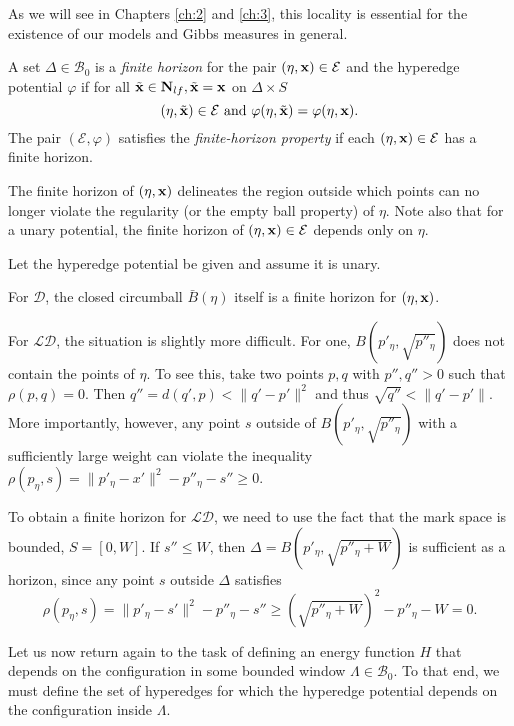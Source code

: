 As we will see in Chapters \ref{ch:2} and \ref{ch:3}, this locality is essential for the existence of our models and Gibbs measures in general. 

\begin{definition}
	A set $\Delta \in \mathcal B_0$ is a \textit{finite horizon} for the pair $(\eta,{\mathbf{x}}) \in \mathcal E$ and the hyperedge potential $\varphi$ if for all $\tilde{{\mathbf{x}}} \in \mathbf N_{lf}, \tilde{{\mathbf{x}}} = {\mathbf{x}}$ on $\Delta\times S$ 
$$(\eta,\tilde{{\mathbf{x}}})\in\mathcal E \text{ and } \varphi(\eta,\tilde{{\mathbf{x}}}) = \varphi(\eta,{\mathbf{x}}). $$
The pair $(\mathcal E, \varphi)$ satisfies the \textit{finite-horizon property} if each $(\eta,{\mathbf{x}})\in \mathcal E$ has a finite horizon.
\end{definition}

The finite horizon of $(\eta,{\mathbf{x}})$ delineates the region outside which points can no longer violate the regularity (or the empty ball property) of $\eta$. 
Note also that for a unary potential, the finite horizon of $(\eta,{\mathbf{x}})\in \mathcal E$ depends only on $\eta$.

\begin{remark} \label{r:horizons}
Let the hyperedge potential be given and assume it is unary.

For $\mathcal D$, the closed circumball $\bar B(\eta)$ itself is a finite horizon for $(\eta,{\mathbf{x}})$.

For $\mathcal {LD}$, the situation is slightly more difficult. For one, $B(p'_\eta, \sqrt{p''_\eta})$ does not contain the points of $\eta$. To see this, take two points $p,q$ with $p'',q''>0$ such that $\rho(p,q)=0$. Then $q'' = d(q',p) < \|q'-p'\|^2$ and thus $\sqrt{q''} < \|q'-p'\|$. More importantly, however, any point $s$ outside of $B(p'_\eta, \sqrt{p''_\eta})$ with a sufficiently large weight can violate the inequality $\rho(p_\eta,s) = \|p'_\eta - x'\|^2 - p''_\eta - s'' \geq 0$. 

To obtain a finite horizon for $\mathcal {LD}$, we need to use the fact that the mark space is bounded, $S=[0,W]$. If $s'' \leq W$, then $\Delta = B(p'_\eta, \sqrt{p''_\eta + W})$ is sufficient as a horizon, since any point $s$ outside $\Delta$ satisfies
$$\rho(p_\eta, s) = \|p'_\eta - s'\|^2 - p''_\eta - s'' \geq \left(\sqrt{p''_\eta+W}\right)^2-p''_\eta-W = 0.$$ 

\end{remark}

Let us now return again to the task of defining an energy function $H$ that depends on the configuration in some bounded window $\Lambda \in \mathcal B_0$. To that end, we must define the set of hyperedges for which the hyperedge potential depends on the configuration inside $\Lambda$. 

